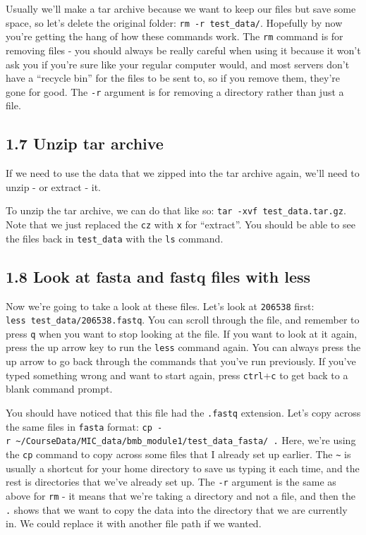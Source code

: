 \documentclass[
]{book}
\begin{document}
Usually we'll make a tar archive because we want to keep our files but save some space, so let's delete the original folder: \texttt{rm\ -r\ test\_data/}. Hopefully by now you're getting the hang of how these commands work. The \texttt{rm} command is for removing files - you should always be really careful when using it because it won't ask you if you're sure like your regular computer would, and most servers don't have a ``recycle bin'' for the files to be sent to, so if you remove them, they're gone for good. The \texttt{-r} argument is for removing a directory rather than just a file.

\subsection{1.7 Unzip tar archive}\label{unzip-tar-archive}

If we need to use the data that we zipped into the tar archive again, we'll need to unzip - or extract - it.

To unzip the tar archive, we can do that like so: \texttt{tar\ -xvf\ test\_data.tar.gz}. Note that we just replaced the \texttt{cz} with \texttt{x} for ``extract''. You should be able to see the files back in \texttt{test\_data} with the \texttt{ls} command.

\subsection{1.8 Look at fasta and fastq files with less}\label{look-at-fasta-and-fastq-files-with-less}

Now we're going to take a look at these files. Let's look at \texttt{206538} first: \texttt{less\ test\_data/206538.fastq}. You can scroll through the file, and remember to press \texttt{q} when you want to stop looking at the file. If you want to look at it again, press the up arrow key to run the \texttt{less} command again. You can always press the up arrow to go back through the commands that you've run previously. If you've typed something wrong and want to start again, press \texttt{ctrl}+\texttt{c} to get back to a blank command prompt.

You should have noticed that this file had the \texttt{.fastq} extension. Let's copy across the same files in \texttt{fasta} format: \texttt{cp\ -r\ \textasciitilde{}/CourseData/MIC\_data/bmb\_module1/test\_data\_fasta/\ .}
Here, we're using the \texttt{cp} command to copy across some files that I already set up earlier. The \texttt{\textasciitilde{}} is usually a shortcut for your home directory to save us typing it each time, and the rest is directories that we've already set up. The \texttt{-r} argument is the same as above for \texttt{rm} - it means that we're taking a directory and not a file, and then the \texttt{.} shows that we want to copy the data into the directory that we are currently in. We could replace it with another file path if we wanted.
\end{document}
